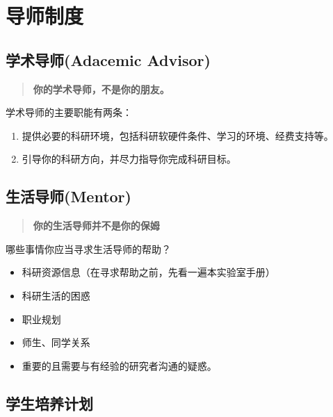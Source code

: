 \documentclass[
]{book}
\providecommand{\tightlist}{%
  \setlength{\itemsep}{0pt}\setlength{\parskip}{0pt}}
\begin{document}
\hypertarget{advisor}{%
\chapter{导师制度}\label{advisor}}

\hypertarget{ux5b66ux672fux5bfcux5e08adacemic-advisor}{%
\section{学术导师(Adacemic Advisor)}\label{ux5b66ux672fux5bfcux5e08adacemic-advisor}}

\begin{quote}
\textbf{你的学术导师，不是你的朋友。}
\end{quote}

学术导师的主要职能有两条：

\begin{enumerate}
\def\labelenumi{\arabic{enumi}.}
\tightlist
\item
  提供必要的科研环境，包括科研软硬件条件、学习的环境、经费支持等。
\item
  引导你的科研方向，并尽力指导你完成科研目标。
\end{enumerate}

\hypertarget{ux751fux6d3bux5bfcux5e08mentor}{%
\section{生活导师(Mentor)}\label{ux751fux6d3bux5bfcux5e08mentor}}

\begin{quote}
\textbf{你的生活导师并不是你的保姆}
\end{quote}

哪些事情你应当寻求生活导师的帮助？

\begin{itemize}
\tightlist
\item
  科研资源信息（在寻求帮助之前，先看一遍本实验室手册）
\item
  科研生活的困惑
\item
  职业规划
\item
  师生、同学关系
\item
  重要的且需要与有经验的研究者沟通的疑惑。
\end{itemize}

\hypertarget{ux5b66ux751fux57f9ux517bux8ba1ux5212}{%
\section{学生培养计划}\label{ux5b66ux751fux57f9ux517bux8ba1ux5212}}
\end{document}
